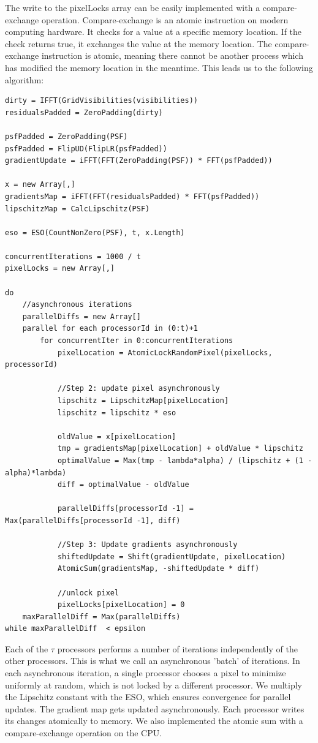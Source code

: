 The write to the pixelLocks array can be easily implemented with a compare-exchange operation. Compare-exchange is an atomic instruction on modern computing hardware.  It checks for a value at a specific memory location. If the check returns true, it exchanges the value at the memory location. The compare-exchange instruction is atomic, meaning there cannot be another process which has modified the memory location in the meantime. This leads us to the following algorithm:

\begin{lstlisting}
dirty = IFFT(GridVisibilities(visibilities))
residualsPadded = ZeroPadding(dirty)

psfPadded = ZeroPadding(PSF)
psfPadded = FlipUD(FlipLR(psfPadded))
gradientUpdate = iFFT(FFT(ZeroPadding(PSF)) * FFT(psfPadded))

x = new Array[,]
gradientsMap = iFFT(FFT(residualsPadded) * FFT(psfPadded))
lipschitzMap = CalcLipschitz(PSF)

eso = ESO(CountNonZero(PSF), t, x.Length)

concurrentIterations = 1000 / t
pixelLocks = new Array[,]

do 
	//asynchronous iterations
	parallelDiffs = new Array[]
	parallel for each processorId in (0:t)+1
		for concurrentIter in 0:concurrentIterations
			pixelLocation = AtomicLockRandomPixel(pixelLocks, processorId)
			
			//Step 2: update pixel asynchronously
			lipschitz = LipschitzMap[pixelLocation]
			lipschitz = lipschitz * eso
			
			oldValue = x[pixelLocation]
			tmp = gradientsMap[pixelLocation] + oldValue * lipschitz
			optimalValue = Max(tmp - lambda*alpha) / (lipschitz + (1 - alpha)*lambda)
			diff = optimalValue - oldValue
			
			parallelDiffs[processorId -1] = Max(parallelDiffs[processorId -1], diff)
			
			//Step 3: Update gradients asynchronously
			shiftedUpdate = Shift(gradientUpdate, pixelLocation)
			AtomicSum(gradientsMap, -shiftedUpdate * diff)
	
			//unlock pixel
			pixelLocks[pixelLocation] = 0
	maxParallelDiff = Max(parallelDiffs)
while maxParallelDiff  < epsilon

\end{lstlisting}

Each of the $\tau$ processors performs a number of iterations independently of the other processors. This is what we call an asynchronous 'batch' of iterations. In each asynchronous iteration, a single processor chooses a pixel to minimize uniformly at random, which is not locked by a different processor. We multiply the Lipschitz constant with the ESO, which ensures convergence for parallel updates. The gradient map gets updated asynchronously. Each processor writes its changes atomically to memory. We also implemented the atomic sum with a compare-exchange operation on the CPU.

